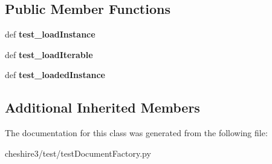 \subsection*{Public Member Functions}
\begin{DoxyCompactItemize}
\item 
\hypertarget{classcheshire3_1_1test_1_1test_document_factory_1_1_document_factory_test_case_a6b6dd100716a612fa7d15f2f8c6e4bb0}{def {\bfseries test\-\_\-load\-Instance}}\label{classcheshire3_1_1test_1_1test_document_factory_1_1_document_factory_test_case_a6b6dd100716a612fa7d15f2f8c6e4bb0}

\item 
\hypertarget{classcheshire3_1_1test_1_1test_document_factory_1_1_document_factory_test_case_a98c447d9440ba117fc83a35d59574700}{def {\bfseries test\-\_\-load\-Iterable}}\label{classcheshire3_1_1test_1_1test_document_factory_1_1_document_factory_test_case_a98c447d9440ba117fc83a35d59574700}

\item 
\hypertarget{classcheshire3_1_1test_1_1test_document_factory_1_1_document_factory_test_case_a1fc1fe09714137910a43207cfcbb441d}{def {\bfseries test\-\_\-loaded\-Instance}}\label{classcheshire3_1_1test_1_1test_document_factory_1_1_document_factory_test_case_a1fc1fe09714137910a43207cfcbb441d}

\end{DoxyCompactItemize}
\subsection*{Additional Inherited Members}


The documentation for this class was generated from the following file\-:\begin{DoxyCompactItemize}
\item 
cheshire3/test/test\-Document\-Factory.\-py\end{DoxyCompactItemize}
